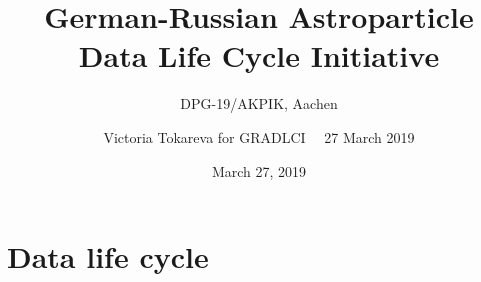 \documentclass[18pt]{beamer}
\title[GRADLCI]{German-Russian Astroparticle \\Data Life Cycle Initiative}
\subtitle{DPG-19/AKPIK, Aachen}
\author[Victoria Tokareva]{
  Victoria Tokareva for GRADLCI ~\textbar~27 March 2019
}
\institute{Institute for Nuclear Physics (IKP)}
\date{March  27, 2019}
\begin{document}



\section{Data life cycle}








\end{document}
